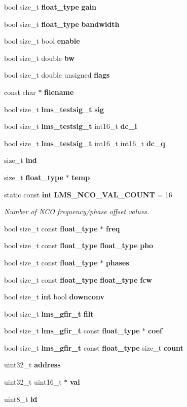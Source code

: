 \begin{DoxyCompactItemize}
bool size\+\_\+t {\bf float\+\_\+type} {\bf gain}
\item 
bool size\+\_\+t {\bf float\+\_\+type} {\bf bandwidth}
\item 
bool size\+\_\+t bool {\bf enable}
\item 
bool size\+\_\+t double {\bf bw}
\item 
bool size\+\_\+t double unsigned {\bf flags}
\item 
const char $\ast$ {\bf filename}
\item 
bool size\+\_\+t {\bf lms\+\_\+testsig\+\_\+t} {\bf sig}
\item 
bool size\+\_\+t {\bf lms\+\_\+testsig\+\_\+t} int16\+\_\+t {\bf dc\+\_\+i}
\item 
bool size\+\_\+t {\bf lms\+\_\+testsig\+\_\+t} int16\+\_\+t int16\+\_\+t {\bf dc\+\_\+q}
\item 
size\+\_\+t {\bf ind}
\item 
size\+\_\+t {\bf float\+\_\+type} $\ast$ {\bf temp}
\item 
static const {\bf int} {\bf L\+M\+S\+\_\+\+N\+C\+O\+\_\+\+V\+A\+L\+\_\+\+C\+O\+U\+NT} = 16
\begin{DoxyCompactList}\small\item\em Number of N\+CO frequency/phase offset values. \end{DoxyCompactList}\item 
bool size\+\_\+t const {\bf float\+\_\+type} $\ast$ {\bf freq}
\item 
bool size\+\_\+t const {\bf float\+\_\+type} {\bf float\+\_\+type} {\bf pho}
\item 
bool size\+\_\+t const {\bf float\+\_\+type} $\ast$ {\bf phases}
\item 
bool size\+\_\+t const {\bf float\+\_\+type} {\bf float\+\_\+type} {\bf fcw}
\item 
bool size\+\_\+t {\bf int} bool {\bf downconv}
\item 
bool size\+\_\+t {\bf lms\+\_\+gfir\+\_\+t} {\bf filt}
\item 
bool size\+\_\+t {\bf lms\+\_\+gfir\+\_\+t} const {\bf float\+\_\+type} $\ast$ {\bf coef}
\item 
bool size\+\_\+t {\bf lms\+\_\+gfir\+\_\+t} const {\bf float\+\_\+type} size\+\_\+t {\bf count}
\item 
uint32\+\_\+t {\bf address}
\item 
uint32\+\_\+t uint16\+\_\+t $\ast$ {\bf val}
\item 
uint8\+\_\+t {\bf id}
\item 

\end{DoxyCompactItemize}

